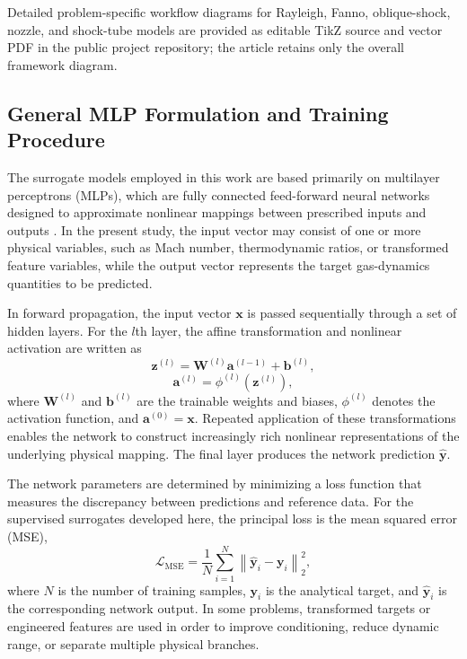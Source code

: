 \documentclass[preprint,12pt]{elsarticle}
\newcommand{\rev}[1]{#1}
\newcommand{\rev}[1]{\textcolor{revisionblue}{#1}}
\begin{document}
\rev{Detailed problem-specific workflow diagrams for Rayleigh, Fanno, oblique-shock, nozzle, and shock-tube models are provided as editable TikZ source and vector PDF in the public project repository; the article retains only the overall framework diagram.}

\subsection{General MLP Formulation and Training Procedure}

The surrogate models employed in this work are based primarily on multilayer perceptrons (MLPs), which are fully connected feed-forward neural networks designed to approximate nonlinear mappings between prescribed inputs and outputs \cite{Goodfellow}. In the present study, the input vector may consist of one or more physical variables, such as Mach number, thermodynamic ratios, or transformed feature variables, while the output vector represents the target gas-dynamics quantities to be predicted.

In forward propagation, the input vector $\mathbf{x}$ is passed sequentially through a set of hidden layers. For the $l$th layer, the affine transformation and nonlinear activation are written as
\begin{equation}
\mathbf{z}^{(l)} = \mathbf{W}^{(l)} \mathbf{a}^{(l-1)} + \mathbf{b}^{(l)},
\end{equation}
\begin{equation}
\mathbf{a}^{(l)} = \phi^{(l)}\!\left(\mathbf{z}^{(l)}\right),
\end{equation}
where $\mathbf{W}^{(l)}$ and $\mathbf{b}^{(l)}$ are the trainable weights and biases, $\phi^{(l)}$ denotes the activation function, and $\mathbf{a}^{(0)}=\mathbf{x}$. Repeated application of these transformations enables the network to construct increasingly rich nonlinear representations of the underlying physical mapping. The final layer produces the network prediction $\hat{\mathbf{y}}$.

The network parameters are determined by minimizing a loss function that measures the discrepancy between predictions and reference data. For the supervised surrogates developed here, the principal loss is the mean squared error (MSE),
\begin{equation}
\mathcal{L}_{\mathrm{MSE}} = \frac{1}{N} \sum_{i=1}^{N} \left\| \hat{\mathbf{y}}_i - \mathbf{y}_i \right\|_2^2,
\end{equation}
where $N$ is the number of training samples, $\mathbf{y}_i$ is the analytical target, and $\hat{\mathbf{y}}_i$ is the corresponding network output. In some problems, transformed targets or engineered features are used in order to improve conditioning, reduce dynamic range, or separate multiple physical branches.
\end{document}
